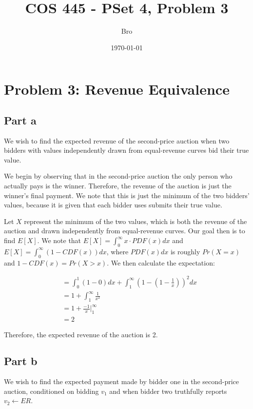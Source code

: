 \documentclass[12pt]{article}%
\begin{document}
\title{COS 445 - PSet 4, Problem 3} %
\author{Bro} %
\date{\today}
\maketitle
\section*{Problem 3: Revenue Equivalence}
\subsection*{Part a}
We wish to find the expected revenue of the second-price auction when two bidders with values independently drawn from equal-revenue curves bid their true value.

We begin by observing that in the second-price auction the only person who actually pays is the winner. Therefore, the revenue of the auction is just the winner's final payment. We note that this is just the minimum of the two bidders' values, because it is given that each bidder uses submits their true value.

Let $X$ represent the minimum of the two values, which is both the revenue of the auction and drawn independently from equal-revenue curves. Our goal then is to find $E[X]$. We note that $E[X] = \int_{0}^{\infty} x \cdot PDF(x)dx$ and $E[X] = \int_{0}^{\infty} (1 - CDF(x))dx$, where $PDF(x)dx$ is roughly $Pr(X = x)$ and $1 - CDF(x) = Pr (X > x)$. We then calculate the expectation:

\begin{equation}
\begin{split}
&= \int_{0}^{1} (1 - 0)dx + \int_{1}^{\infty} (1 - (1 - \frac{1}{x}))^{2}dx\\
&= 1 + \int_{1}^{\infty} \frac{1}{x^2}\\
&= 1 + \frac{-1}{x} \Bigr\rvert_{1}^{\infty}\\
&= 2
\end{split}
\end{equation}

Therefore, the expected revenue of the auction is 2.

\subsection*{Part b}
We wish to find the expected payment made by bidder one in the second-price auction, conditioned on bidding $v_1$ and when bidder two truthfully reports $v_2 \leftarrow ER$.
\end{document}
